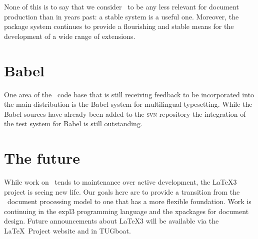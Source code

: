 \documentclass{ltnews}
\begin{document}
None of this is to say that we consider \LaTeXe\ to be any less
relevant for document production than in years past: a stable system
is a useful one.
Moreover, the package system continues to provide a flourishing and stable
means
for the development of a wide range of extensions.

\newpage

\section{Babel}

One area of the \LaTeXe\ code base that is still receiving feedback to
be incorporated into the main distribution is the Babel system for
multilingual typesetting.
While the Babel sources have already been added to the \textsc{svn} repository the
integration of the test system for Babel is still outstanding.


\section{The future}

While work on \LaTeXe\ tends to maintenance over active development,
the \LaTeX3 project is
seeing new life. Our goals here are to provide a transition from the
\LaTeXe\ document processing model to one that has a more flexible
foundation. Work is continuing in the \textsf{expl3} programming
language and the \textsf{xpackages} for document design. Future
announcements
about \LaTeX3 will be available via the \LaTeX\ Project
website and in TUGboat.
\end{document}

